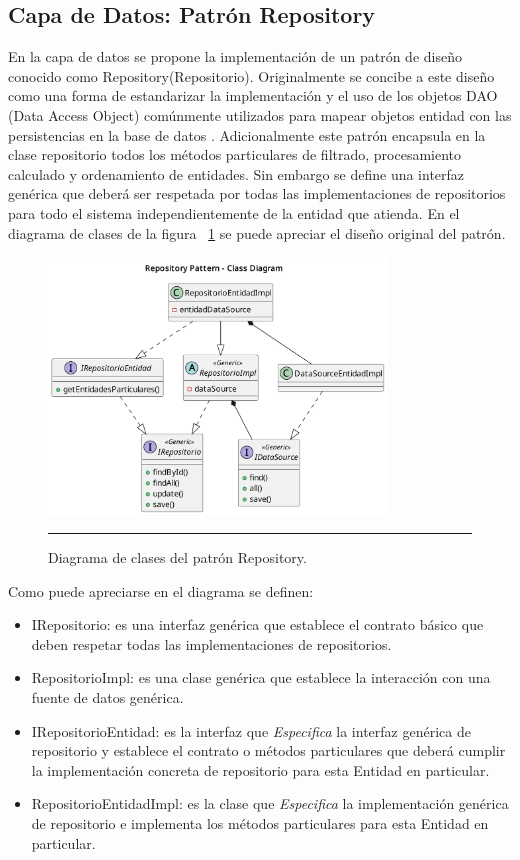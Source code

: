 \subsection{Capa de Datos: Patrón Repository}
En la capa de datos se propone la implementación de un patrón de diseño conocido como Repository(Repositorio). 
Originalmente se concibe a este diseño como una forma de estandarizar la implementación y el uso de los objetos DAO (Data Access Object) comúnmente utilizados para mapear objetos entidad con las persistencias en la base de datos \cite{repo_wolf}.
Adicionalmente este patrón encapsula en la clase repositorio todos los métodos particulares de filtrado, procesamiento calculado y ordenamiento de entidades.
Sin embargo se define una interfaz genérica que deberá ser respetada por todas las implementaciones de repositorios para todo el sistema independientemente de la entidad que atienda.
En el diagrama de clases de la figura ~\ref{fig:uml_clases_repository} se puede apreciar el diseño original del patrón.

\begin{figure}[htbp]
	\centering
	\includegraphics[width=0.8\textwidth]{Figures/design/CLASS_repository_def.png}
	\rule{35em}{1pt}
	\caption[Repository Pattern Class Diagram]{Diagrama de clases del patrón Repository.}
	\label{fig:uml_clases_repository}
\end{figure}

Como puede apreciarse en el diagrama se definen:
\begin{itemize}
	\item IRepositorio: es una interfaz genérica que establece el contrato básico que deben respetar todas las implementaciones de repositorios.
	\item RepositorioImpl: es una clase genérica que establece la interacción con una fuente de datos genérica.
	\item IRepositorioEntidad: es la interfaz que \textit{Especifica} la interfaz genérica de repositorio y establece el contrato o métodos particulares que deberá cumplir la implementación concreta de repositorio para esta Entidad en particular.
	\item RepositorioEntidadImpl: es la clase que \textit{Especifica} la implementación genérica de repositorio e implementa los métodos particulares para esta Entidad en particular.
\end{itemize}

